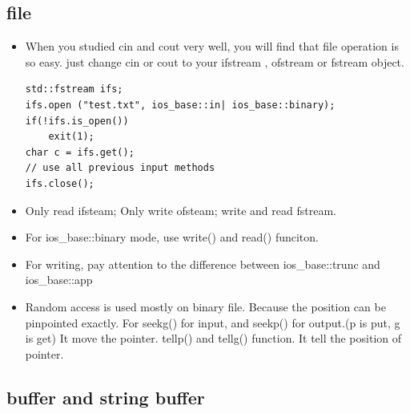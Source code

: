 \documentclass[a4paper,11pt,twoside]{book}
\begin{document}
\subsection{file}
\begin{itemize}
	\item When you studied cin and cout very well, you will find that file operation is so easy. just change cin or cout to your ifstream , ofstream or fstream object.
	
\begin{lstlisting}[numbers=none]
std::fstream ifs;
ifs.open ("test.txt", ios_base::in| ios_base::binary);
if(!ifs.is_open())
	exit(1);
char c = ifs.get();
// use all previous input methods
ifs.close();
\end{lstlisting}
	\item Only read ifsteam;  Only write ofsteam; write and read fstream.
	
	\item For ios\_base::binary mode, use write() and read() funciton.
	
	\item For writing, pay attention to the difference between ios\_base::trunc and ios\_base::app
	
	\item Random access is used mostly on binary file. Because the position can be pinpointed exactly. For seekg() for input, and seekp() for output.(p is put, g is get) It move the pointer. tellp() and tellg() function.  It tell the position of pointer.
	
\end{itemize}

\subsection{buffer and string buffer}
\end{document}
